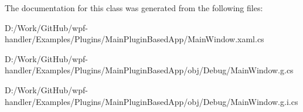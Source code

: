 The documentation for this class was generated from the following files\+:\begin{DoxyCompactItemize}
\item 
D\+:/\+Work/\+Git\+Hub/wpf-\/handler/\+Examples/\+Plugins/\+Main\+Plugin\+Based\+App/Main\+Window.\+xaml.\+cs\item 
D\+:/\+Work/\+Git\+Hub/wpf-\/handler/\+Examples/\+Plugins/\+Main\+Plugin\+Based\+App/obj/\+Debug/Main\+Window.\+g.\+cs\item 
D\+:/\+Work/\+Git\+Hub/wpf-\/handler/\+Examples/\+Plugins/\+Main\+Plugin\+Based\+App/obj/\+Debug/Main\+Window.\+g.\+i.\+cs\end{DoxyCompactItemize}
